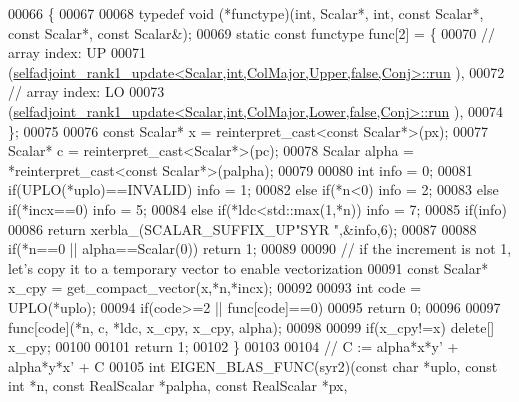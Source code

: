 \begin{DoxyCode}
00066 \{
00067 
00068   \textcolor{keyword}{typedef} void (*functype)(int, Scalar*, int, \textcolor{keyword}{const} Scalar*, \textcolor{keyword}{const} Scalar*, \textcolor{keyword}{const} Scalar&);
00069   \textcolor{keyword}{static} \textcolor{keyword}{const} functype func[2] = \{
00070     \textcolor{comment}{// array index: UP}
00071     (\hyperlink{struct_eigen_1_1selfadjoint__rank1__update}{selfadjoint\_rank1\_update<Scalar,int,ColMajor,Upper,false,Conj>::run}
      ),
00072     \textcolor{comment}{// array index: LO}
00073     (\hyperlink{struct_eigen_1_1selfadjoint__rank1__update}{selfadjoint\_rank1\_update<Scalar,int,ColMajor,Lower,false,Conj>::run}
      ),
00074   \};
00075 
00076   \textcolor{keyword}{const} Scalar* x = \textcolor{keyword}{reinterpret\_cast<}\textcolor{keyword}{const }Scalar*\textcolor{keyword}{>}(px);
00077   Scalar* c = \textcolor{keyword}{reinterpret\_cast<}Scalar*\textcolor{keyword}{>}(pc);
00078   Scalar alpha = *\textcolor{keyword}{reinterpret\_cast<}\textcolor{keyword}{const }Scalar*\textcolor{keyword}{>}(palpha);
00079 
00080   \textcolor{keywordtype}{int} info = 0;
00081   \textcolor{keywordflow}{if}(UPLO(*uplo)==INVALID)                                            info = 1;
00082   \textcolor{keywordflow}{else} \textcolor{keywordflow}{if}(*n<0)                                                       info = 2;
00083   \textcolor{keywordflow}{else} \textcolor{keywordflow}{if}(*incx==0)                                                   info = 5;
00084   \textcolor{keywordflow}{else} \textcolor{keywordflow}{if}(*ldc<std::max(1,*n))                                        info = 7;
00085   \textcolor{keywordflow}{if}(info)
00086     \textcolor{keywordflow}{return} xerbla\_(SCALAR\_SUFFIX\_UP\textcolor{stringliteral}{"SYR  "},&info,6);
00087 
00088   \textcolor{keywordflow}{if}(*n==0 || alpha==Scalar(0)) \textcolor{keywordflow}{return} 1;
00089 
00090   \textcolor{comment}{// if the increment is not 1, let's copy it to a temporary vector to enable vectorization}
00091   \textcolor{keyword}{const} Scalar* x\_cpy = get\_compact\_vector(x,*n,*incx);
00092 
00093   \textcolor{keywordtype}{int} code = UPLO(*uplo);
00094   \textcolor{keywordflow}{if}(code>=2 || func[code]==0)
00095     \textcolor{keywordflow}{return} 0;
00096 
00097   func[code](*n, c, *ldc, x\_cpy, x\_cpy, alpha);
00098 
00099   \textcolor{keywordflow}{if}(x\_cpy!=x)  \textcolor{keyword}{delete}[] x\_cpy;
00100 
00101   \textcolor{keywordflow}{return} 1;
00102 \}
00103 
00104 \textcolor{comment}{// C := alpha*x*y' + alpha*y*x' + C}
00105 \textcolor{keywordtype}{int} EIGEN\_BLAS\_FUNC(syr2)(\textcolor{keyword}{const} \textcolor{keywordtype}{char} *uplo, \textcolor{keyword}{const} \textcolor{keywordtype}{int} *n, \textcolor{keyword}{const} RealScalar *palpha, \textcolor{keyword}{const} RealScalar *px, \textcolor{keyword}{
}
\end{DoxyCode}
